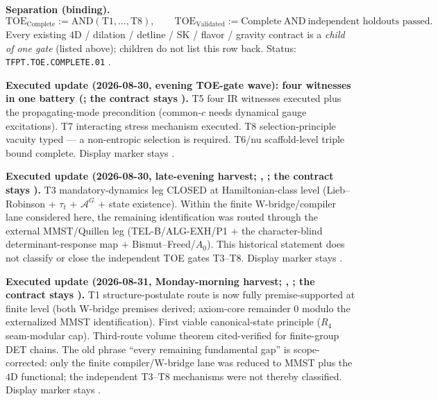 \documentclass[11pt,a4paper]{article}
\begin{document}
\par\smallskip\noindent\textbf{Separation (binding).}
\[
  \mathrm{TOE}_{\mathrm{Complete}}:=\mathrm{AND}(\mathrm{T1},\ldots,\mathrm{T8}),
  \qquad
  \mathrm{TOE}_{\mathrm{Validated}}:=\mathrm{Complete}\ \mathrm{AND}\ \text{independent holdouts passed}.
\]
Every existing $4$D / dilation / detline / SK / flavor / gravity contract is a \emph{child of
one gate} (listed above); children do not list this row back.  Status:
\texttt{TFPT.TOE.COMPLETE.01} \mO.

\par\smallskip\noindent\textbf{Executed update (2026-08-30, evening TOE-gate wave): four witnesses
in one battery
(; the contract stays \mO).}
T5 four IR witnesses executed plus the propagating-mode precondition (common-$c$ needs dynamical
gauge excitations).  T7 interacting stress mechanism executed.  T8 selection-principle vacuity
typed --- a non-entropic selection is required.  T6/nu scaffold-level triple bound complete.
Display marker stays \mO.

\par\smallskip\noindent\textbf{Executed update (2026-08-30, late-evening harvest;
,
;
the contract stays \mO).}
T3 mandatory-dynamics leg CLOSED at Hamiltonian-class level (Lieb--Robinson $+$ $\tau_t$ $+$
$\mathcal A^G$ $+$ state existence).  Within the finite W-bridge/compiler lane considered
here, the remaining identification was routed through the external MMST/Quillen leg
(TEL-B/ALG-EXH/P1 $+$ the character-blind determinant-response map $+$
Bismut--Freed/$A_0$).  This historical statement does not classify or close the
independent TOE gates T3--T8.  Display marker stays \mO.

\par\smallskip\noindent\textbf{Executed update (2026-08-31, Monday-morning harvest;
,
;
the contract stays \mO).}
T1 structure-postulate route is now fully premise-supported at finite level (both
W-bridge premises derived; axiom-core remainder $0$ modulo the externalized MMST
identification).  First viable canonical-state principle ($R_4$ seam-modular cap).
Third-route volume theorem cited-verified for finite-group DET chains.  The old phrase
``every remaining fundamental gap'' is scope-corrected: only the finite compiler/W-bridge
lane was reduced to MMST plus the $4$D functional; the independent T3--T8 mechanisms were
not thereby classified.  Display marker stays \mO.
\end{document}
